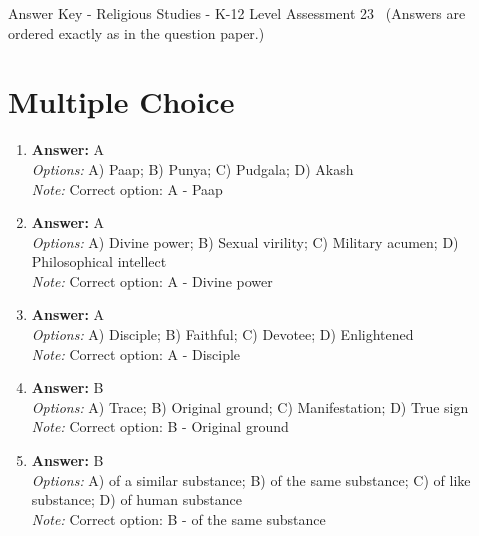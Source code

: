 \documentclass[12pt]{article}
\begin{document}
\begin{center}
Answer Key - Religious Studies - K-12 Level Assessment 23 \
\small (Answers are ordered exactly as in the question paper.)
\end{center}

\section*{Multiple Choice}
\begin{enumerate}[label=\arabic*.]
\item \textbf{Answer:} A
\\ \textit{Options:} A) Paap; B) Punya; C) Pudgala; D) Akash
\\ \textit{Note:} Correct option: A - Paap
\item \textbf{Answer:} A
\\ \textit{Options:} A) Divine power; B) Sexual virility; C) Military acumen; D) Philosophical intellect
\\ \textit{Note:} Correct option: A - Divine power
\item \textbf{Answer:} A
\\ \textit{Options:} A) Disciple; B) Faithful; C) Devotee; D) Enlightened
\\ \textit{Note:} Correct option: A - Disciple
\item \textbf{Answer:} B
\\ \textit{Options:} A) Trace; B) Original ground; C) Manifestation; D) True sign
\\ \textit{Note:} Correct option: B - Original ground
\item \textbf{Answer:} B
\\ \textit{Options:} A) of a similar substance; B) of the same substance; C) of like substance; D) of human substance
\\ \textit{Note:} Correct option: B - of the same substance
\end{enumerate}
\end{document}
